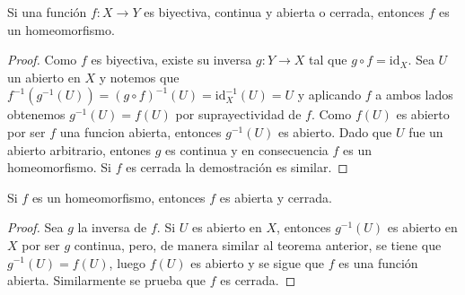 
\begin{theorem}
Si una función $f : X \longrightarrow Y$ es biyectiva, continua y abierta o cerrada, entonces $f$ es un homeomorfismo.
\end{theorem}

\begin{proof}
Como $f$ es biyectiva, existe su inversa $g : Y \longrightarrow X$ tal que $g \circ f = \text{id}_X$. Sea $U$ un abierto en $X$ y notemos que $f^{-1}(g^{-1}(U)) = (g \circ f)^{-1}(U) = \text{id}_X^{-1}(U) = U$ y aplicando $f$ a ambos lados obtenemos $g^{-1}(U) = f(U)$ por suprayectividad de $f$. Como $f(U)$ es abierto por ser $f$ una funcion abierta, entonces $g^{-1}(U)$ es abierto. Dado que $U$ fue un abierto arbitrario, entones $g$ es continua y en consecuencia $f$ es un homeomorfismo. Si $f$ es cerrada la demostración es similar.
\end{proof}

\begin{theorem}
Si $f$ es un homeomorfismo, entonces $f$ es abierta y cerrada.
\end{theorem}

\begin{proof}
Sea $g$ la inversa de $f$. Si $U$ es abierto en $X$, entonces $g^{-1}(U)$ es abierto en $X$ por ser $g$ continua, pero, de manera similar al teorema anterior, se tiene que $g^{-1}(U) = f(U)$, luego $f(U)$ es abierto y se sigue que $f$ es una función abierta. Similarmente se prueba que $f$ es cerrada.
\end{proof}
